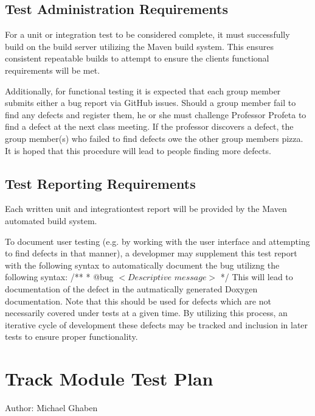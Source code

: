 \documentclass[]{article}
\begin{document}
\subsection{Test Administration Requirements}
For a unit or integration test to be considered complete, it must successfully build on the build server utilizing the Maven build system. This ensures consistent repeatable builds to attempt to ensure the clients functional requirements will be met.

Additionally, for functional testing it is expected that each group member submits either a bug report via GitHub issues. Should a group member fail to find any defects and register them, he or she must challenge Professor Profeta to find a defect at the next class meeting. If the professor discovers a defect, the group member(s) who failed to find defects owe the other group members pizza. It is hoped that this procedure will lead to people finding more defects.
\subsection{Test Reporting Requirements}
Each written unit and integrationtest report will be provided by the Maven automated build system. 

To document user testing (e.g. by working with the user interface and attempting to find defects in that manner), a developmer may supplement this test report with the following syntax to automatically document the bug utilizng the following syntax:\newline \newline
/** \newline
* @bug $<Descriptive$ $ message>$ \newline
*/\newline
\newline
This will lead to documentation of the defect in the autmatically generated Doxygen documentation. Note that this should be used for defects which  are not necessarily covered under tests at a given time. By utilizing this process, an iterative cycle of development these defects may be tracked and inclusion in later tests to ensure proper functionality.

\section{Track Module Test Plan}
Author: Michael Ghaben
\end{document}
